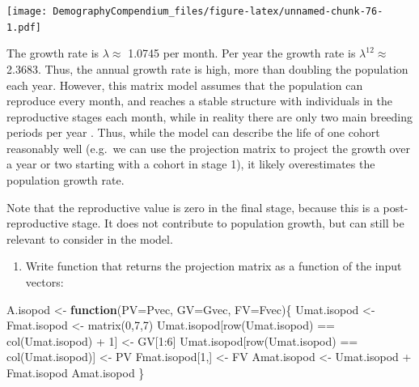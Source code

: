 \documentclass[
]{book}
\newenvironment{Shaded}{\begin{snugshade}}{\end{snugshade}}
\newcommand{\AttributeTok}[1]{\textcolor[rgb]{0.77,0.63,0.00}{#1}}
\newcommand{\ControlFlowTok}[1]{\textcolor[rgb]{0.13,0.29,0.53}{\textbf{#1}}}
\newcommand{\DecValTok}[1]{\textcolor[rgb]{0.00,0.00,0.81}{#1}}
\newcommand{\FunctionTok}[1]{\textcolor[rgb]{0.00,0.00,0.00}{#1}}
\newcommand{\NormalTok}[1]{#1}
\newcommand{\OtherTok}[1]{\textcolor[rgb]{0.56,0.35,0.01}{#1}}
\newcommand{\SpecialCharTok}[1]{\textcolor[rgb]{0.00,0.00,0.00}{#1}}
\providecommand{\tightlist}{%
  \setlength{\itemsep}{0pt}\setlength{\parskip}{0pt}}
\begin{document}
\texttt{[image: DemographyCompendium\_files/figure-latex/unnamed-chunk-76-1.pdf]}

The growth rate is \(\lambda\approx\) 1.0745 per month. Per year the growth rate is \(\lambda^12\approx\) 2.3683. Thus, the annual growth rate is high, more than doubling the population each year. However, this matrix model assumes that the population can reproduce every month, and reaches a stable structure with individuals in the reproductive stages each month, while in reality there are only two main breeding periods per year \citep{Kammenga1}. Thus, while the model can describe the life of one cohort reasonably well (e.g.~we can use the projection matrix to project the growth over a year or two starting with a cohort in stage 1), it likely overestimates the population growth rate.

Note that the reproductive value is zero in the final stage, because this is a post-reproductive stage. It does not contribute to population growth, but can still be relevant to consider in the model.

\begin{enumerate}
\def\labelenumi{\arabic{enumi}.}
\setcounter{enumi}{3}
\tightlist
\item
  Write function that returns the projection matrix as a function of the input vectors:
\end{enumerate}

\begin{Shaded}
\begin{Highlighting}[]
\NormalTok{A.isopod }\OtherTok{\textless{}{-}} \ControlFlowTok{function}\NormalTok{(}\AttributeTok{PV=}\NormalTok{Pvec, }\AttributeTok{GV=}\NormalTok{Gvec, }\AttributeTok{FV=}\NormalTok{Fvec)\{}
\NormalTok{  Umat.isopod }\OtherTok{\textless{}{-}}\NormalTok{ Fmat.isopod }\OtherTok{\textless{}{-}} \FunctionTok{matrix}\NormalTok{(}\DecValTok{0}\NormalTok{,}\DecValTok{7}\NormalTok{,}\DecValTok{7}\NormalTok{)}
\NormalTok{  Umat.isopod[}\FunctionTok{row}\NormalTok{(Umat.isopod) }\SpecialCharTok{==} \FunctionTok{col}\NormalTok{(Umat.isopod) }\SpecialCharTok{+} \DecValTok{1}\NormalTok{] }\OtherTok{\textless{}{-}}\NormalTok{ GV[}\DecValTok{1}\SpecialCharTok{:}\DecValTok{6}\NormalTok{]}
\NormalTok{  Umat.isopod[}\FunctionTok{row}\NormalTok{(Umat.isopod) }\SpecialCharTok{==} \FunctionTok{col}\NormalTok{(Umat.isopod)] }\OtherTok{\textless{}{-}}\NormalTok{ PV}
\NormalTok{  Fmat.isopod[}\DecValTok{1}\NormalTok{,] }\OtherTok{\textless{}{-}}\NormalTok{ FV}
\NormalTok{  Amat.isopod }\OtherTok{\textless{}{-}}\NormalTok{ Umat.isopod }\SpecialCharTok{+}\NormalTok{ Fmat.isopod}
\NormalTok{  Amat.isopod}
\NormalTok{\}}
\end{Highlighting}
\end{Shaded}
\end{document}
